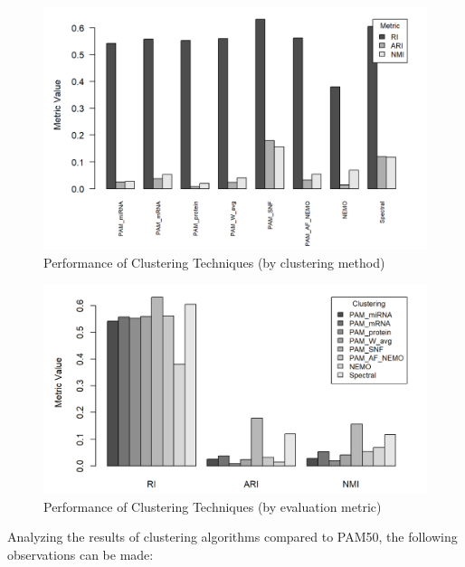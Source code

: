 \begin{figure}[!t]
    \centerline{\includegraphics[width=\columnwidth]{images/clustering.png}}
    \caption{Performance of Clustering Techniques (by clustering method)}
    \label{fig:clustering}
\end{figure}

\begin{figure}[!t]
    \centerline{\includegraphics[width=\columnwidth]{images/evalutation.png}}
    \caption{Performance of Clustering Techniques (by evaluation metric)}
    \label{fig:evaluation}
\end{figure}

Analyzing the results of clustering algorithms compared to PAM50, the following observations can be made:

